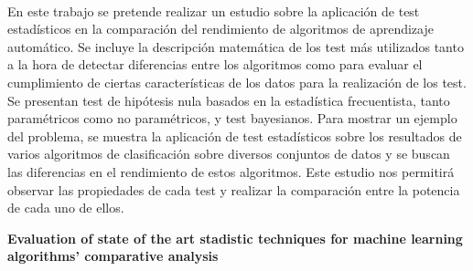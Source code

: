 \chapter*{}






\cleardoublepage
\thispagestyle{empty}

\begin{center}
{\large\bfseries \myTitle }\\
\end{center}
\begin{center}	
	\myName \\
\end{center}

\\

\vspace{0.7cm}
\\

	En este trabajo se pretende realizar un estudio sobre
	la aplicación de test estadísticos en la comparación
	del rendimiento de algoritmos de aprendizaje automático.
	Se incluye la descripción matemática de los test más
	utilizados tanto a la hora de detectar diferencias 
	entre los algoritmos como para evaluar el cumplimiento
	de ciertas características de los datos para la
	realización de los test. Se presentan test de 
	hipótesis nula basados en la estadística frecuentista,
	tanto paramétricos como no paramétricos, y test
	bayesianos. Para mostrar un ejemplo del problema, se 
	muestra la aplicación de test estadísticos sobre
	los resultados de varios algoritmos de clasificación
	sobre diversos conjuntos de datos y se buscan las 
	diferencias en el rendimiento de estos algoritmos.
	Este estudio nos permitirá observar las propiedades
	de cada test y realizar la comparación entre la
	potencia de cada uno de ellos.
\cleardoublepage


\thispagestyle{empty}


\begin{center}
{\large\bfseries Evaluation of state of the art stadistic techniques for machine learning algorithms' comparative analysis}\\
\end{center}
\begin{center}
	\myName	\\
\end{center}

